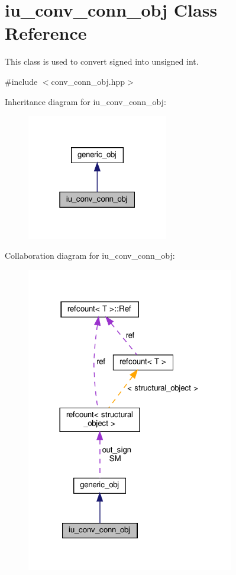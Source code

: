 \hypertarget{classiu__conv__conn__obj}{}\section{iu\+\_\+conv\+\_\+conn\+\_\+obj Class Reference}
\label{classiu__conv__conn__obj}


This class is used to convert signed into unsigned int.  




{\ttfamily \#include $<$conv\+\_\+conn\+\_\+obj.\+hpp$>$}



Inheritance diagram for iu\+\_\+conv\+\_\+conn\+\_\+obj\+:
\nopagebreak
\begin{figure}[H]
\begin{center}
\leavevmode
\includegraphics[width=175pt]{d6/df3/classiu__conv__conn__obj__inherit__graph}
\end{center}
\end{figure}


Collaboration diagram for iu\+\_\+conv\+\_\+conn\+\_\+obj\+:
\nopagebreak
\begin{figure}[H]
\begin{center}
\leavevmode
\includegraphics[width=257pt]{d1/d69/classiu__conv__conn__obj__coll__graph}
\end{center}
\end{figure}
